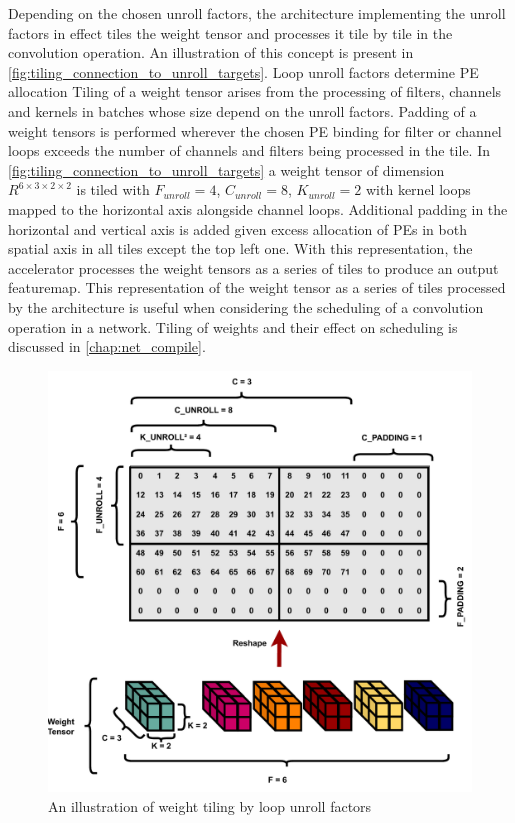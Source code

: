 Depending on the chosen unroll factors, the architecture implementing the unroll
factors in effect tiles the weight tensor and processes it tile by tile in the
convolution operation. An
illustration of this concept is present in
\autoref{fig:tiling_connection_to_unroll_targets}. Loop unroll factors determine
PE allocation 
Tiling of a weight tensor arises from the processing of filters, channels and
kernels in batches whose size depend on the unroll factors. 
Padding of a weight tensors is performed wherever the chosen PE
binding for filter or channel loops exceeds the number of channels and filters
being processed in the tile. In
\autoref{fig:tiling_connection_to_unroll_targets} a weight tensor of dimension
$R^{6\times 3\times 2\times 2}$ is tiled with $F_{unroll} = 4$, $C_{unroll}=8$,
$K_{unroll}=2$ with kernel loops mapped to the horizontal axis alongside channel
loops. Additional padding in the horizontal and vertical axis is added given
excess allocation of PEs in both spatial axis in all tiles except the top left
one. With this representation, the accelerator processes the weight tensors as a
series of tiles to produce an output featuremap.    
This representation of the weight tensor as a series of tiles processed by
the architecture is useful when considering the scheduling of a convolution
operation in a network. Tiling of weights and their effect on scheduling is
discussed in \autoref{chap:net_compile}.

\begin{figure}[]
    \centering
    \includegraphics[scale=0.5]{fig/tiling.pdf}
    \caption{An illustration of weight tiling by loop unroll factors}
    \label{fig:tiling_connection_to_unroll_targets}
\end{figure}

